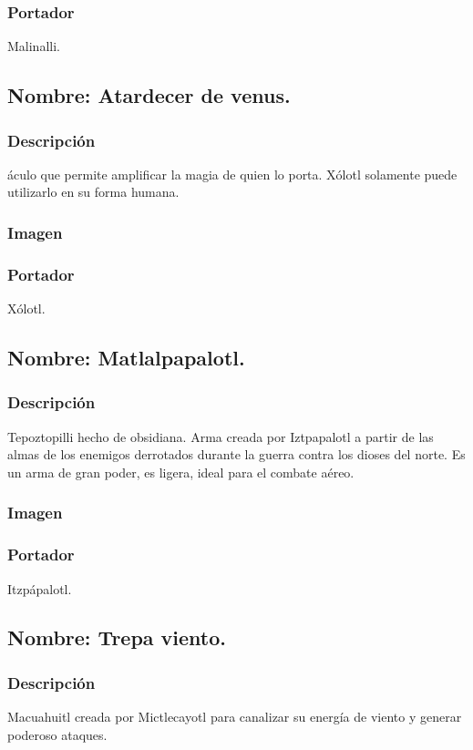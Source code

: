 \documentclass[11pt,letterpaper]{article}
\begin{document}
\subsubsection{Portador}
Malinalli.

\subsection{Nombre: Atardecer de venus.}
\subsubsection{Descripción}
áculo que permite amplificar la magia de quien lo porta. Xólotl solamente puede utilizarlo en su forma humana.
\subsubsection{Imagen}
\subsubsection{Portador}
Xólotl.

\subsection{Nombre: Matlalpapalotl.}
\subsubsection{Descripción}
Tepoztopilli hecho de obsidiana. Arma creada por Iztpapalotl a partir de las almas de los enemigos derrotados durante la guerra contra los dioses del norte. Es un arma de gran poder, es ligera, ideal para el combate aéreo.
\subsubsection{Imagen}
\subsubsection{Portador}
Itzpápalotl.

\subsection{Nombre: Trepa viento.}
\subsubsection{Descripción}
Macuahuitl creada por Mictlecayotl para canalizar su energía de viento y generar poderoso ataques.
\end{document}
